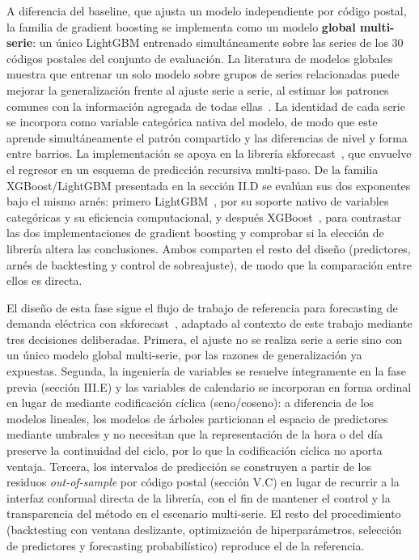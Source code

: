 \documentclass[12pt, a4paper]{article}
\begin{document}
A diferencia del baseline, que ajusta un modelo independiente por código postal, la familia de gradient boosting se implementa como un modelo \textbf{global multi-serie}: un único LightGBM entrenado simultáneamente sobre las series de los 30 códigos postales del conjunto de evaluación. La literatura de modelos globales muestra que entrenar un solo modelo sobre grupos de series relacionadas puede mejorar la generalización frente al ajuste serie a serie, al estimar los patrones comunes con la información agregada de todas ellas~\cite{montero2021}. La identidad de cada serie se incorpora como variable categórica nativa del modelo, de modo que este aprende simultáneamente el patrón compartido y las diferencias de nivel y forma entre barrios. La implementación se apoya en la librería skforecast~\cite{skforecast}, que envuelve el regresor en un esquema de predicción recursiva multi-paso. De la familia XGBoost/LightGBM presentada en la sección II.D se evalúan sus dos exponentes bajo el mismo arnés: primero LightGBM~\cite{ke2017}, por su soporte nativo de variables categóricas y su eficiencia computacional, y después XGBoost~\cite{chen2016}, para contrastar las dos implementaciones de gradient boosting y comprobar si la elección de librería altera las conclusiones. Ambos comparten el resto del diseño (predictores, arnés de backtesting y control de sobreajuste), de modo que la comparación entre ellos es directa.

El diseño de esta fase sigue el flujo de trabajo de referencia para forecasting de demanda eléctrica con skforecast~\cite{skforecast}, adaptado al contexto de este trabajo mediante tres decisiones deliberadas. Primera, el ajuste no se realiza serie a serie sino con un único modelo global multi-serie, por las razones de generalización ya expuestas. Segunda, la ingeniería de variables se resuelve íntegramente en la fase previa (sección III.E) y las variables de calendario se incorporan en forma ordinal en lugar de mediante codificación cíclica (seno/coseno): a diferencia de los modelos lineales, los modelos de árboles particionan el espacio de predictores mediante umbrales y no necesitan que la representación de la hora o del día preserve la continuidad del ciclo, por lo que la codificación cíclica no aporta ventaja. Tercera, los intervalos de predicción se construyen a partir de los residuos \textit{out-of-sample} por código postal (sección V.C) en lugar de recurrir a la interfaz conformal directa de la librería, con el fin de mantener el control y la transparencia del método en el escenario multi-serie. El resto del procedimiento (backtesting con ventana deslizante, optimización de hiperparámetros, selección de predictores y forecasting probabilístico) reproduce el de la referencia.
\end{document}
